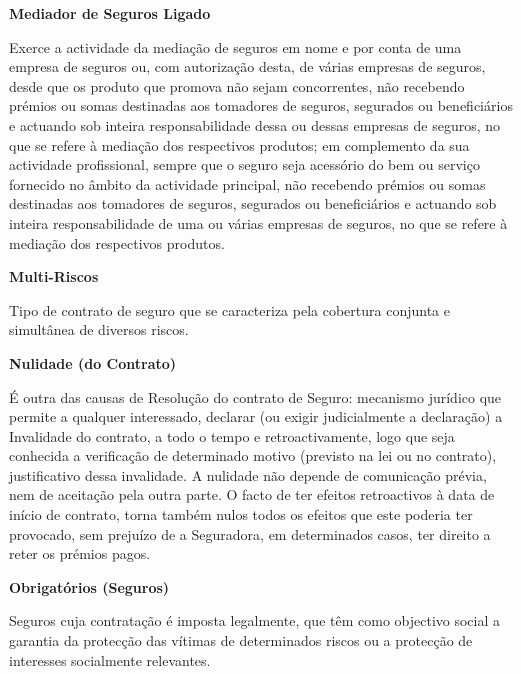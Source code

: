 \begin{description}
\item \textbf{Mediador de Seguros Ligado}

Exerce a actividade da mediação de seguros em nome e por conta de uma empresa de seguros ou, com autorização desta, de várias empresas de seguros, desde que os produto que promova não sejam concorrentes, não recebendo prémios ou somas destinadas aos tomadores de seguros, segurados ou beneficiários e actuando sob inteira responsabilidade dessa ou dessas empresas de seguros, no que se refere à mediação dos respectivos produtos; em complemento da sua actividade profissional, sempre que o seguro seja acessório do bem ou serviço fornecido no âmbito da actividade principal, não recebendo prémios ou somas destinadas aos tomadores de seguros, segurados ou beneficiários e actuando sob inteira responsabilidade de uma ou várias empresas de seguros, no que se refere à mediação dos respectivos produtos.
\end{description}

\begin{description}
\item \textbf{Multi-Riscos}

Tipo de contrato de seguro que se caracteriza pela cobertura conjunta e simultânea de diversos riscos.
\end{description}

\begin{description}
\item \textbf{Nulidade (do Contrato)}

É outra das causas de Resolução do contrato de Seguro: mecanismo jurídico que permite a qualquer interessado, declarar (ou exigir judicialmente a declaração) a Invalidade do contrato, a todo o tempo e retroactivamente, logo que seja conhecida a verificação de determinado motivo (previsto na lei ou no contrato), justificativo dessa invalidade. A nulidade não depende de comunicação prévia, nem de aceitação pela outra parte. O facto de ter efeitos retroactivos à data de início de contrato, torna também nulos todos os efeitos que este poderia ter provocado, sem prejuízo de a Seguradora, em determinados casos, ter direito a reter os prémios pagos.
\end{description}

\begin{description}
\item \textbf{Obrigatórios (Seguros)}

Seguros cuja contratação é imposta legalmente, que têm como objectivo social a garantia da protecção das vítimas de determinados riscos ou a protecção de interesses socialmente relevantes.
\end{description}

